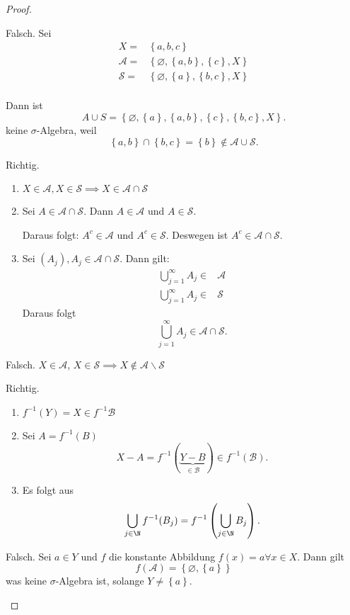 \begin{proof}
	\begin{parts}
	\item Falsch. Sei
		\begin{align*}
			X=&\left\{ a,b,c \right\} \\
			\mathcal A=&\left\{ \varnothing, \left\{ a,b \right\} , \left\{ c \right\} , X \right\} \\
			\mathcal S=&\left\{ \varnothing, \left\{ a \right\} , \left\{ b,c \right\} , X \right\}\\
		\end{align*}

		Dann ist 
		\[
		A\cup S=\left\{ \varnothing, \left\{ a \right\} ,\left\{ a,b \right\} , \left\{ c \right\} , \left\{ b,c \right\}, X  \right\} 
		.\] 
		keine $\sigma$-Algebra, weil
		\[
		\left\{ a,b \right\} \cap \left\{ b,c \right\} =\left\{ b \right\} \not\in \mathcal A \cup \mathcal S
		.\] 

	\item Richtig.
		\begin{enumerate}[label=(\arabic*)]
			\item $X\in \mathcal A, X\in \mathcal S\implies X \in\mathcal A \cap \mathcal S$
			\item Sei $A\in \mathcal A\cap \mathcal S$. Dann  $A\in \mathcal A$ und $A\in\mathcal S$. 

				Daraus folgt: $A^c\in\mathcal A$ und $A^c\in \mathcal S$. Deswegen ist $A^c\in \mathcal A \cap \mathcal S$.

			\item Sei $(A_j), A_j\in\mathcal A\cap \mathcal S$. Dann gilt:
\begin{align*}
	\bigcup_{j=1} ^\infty A_j\in& \mathcal A\\
	\bigcup_{j=1} ^\infty A_j\in& \mathcal S
\end{align*}
Daraus folgt
\[
	\bigcup_{j=1} ^\infty A_j\in \mathcal A\cap \mathcal S
.\] 
		\end{enumerate}
	\item Falsch. $X\in \mathcal A$, $X\in \mathcal S\implies X\not\in \mathcal A \backslash\mathcal S$
	\item Richtig.
		 \begin{enumerate}[label=(\arabic*)]
			 \item $f^{-1}(Y)=X\in f^{-1}\mathcal{B}$ 
			 \item Sei $A=f^{-1}(B)$
				 \[
					 X-A=f^{-1}(\underbrace{Y-B}_{\in \mathcal B})\in f^{-1}(\mathcal B)
			 .\] 

		 \item Es folgt aus
			 \[
				 \bigcup_{j\in \N} f^{-1}(B_j)=f^{-1}\left( \bigcup_{j\in \N} B_j \right) 
			 .\] 
	 \end{enumerate}
		 \item Falsch. Sei $a\in Y$ und $f$ die konstante Abbildung $f(x)=a\forall x\in X$. Dann gilt
			 \[
			 f(\mathcal A)=\left\{ \varnothing, \left\{ a \right\}  \right\} 
			 \] 
			 was keine $\sigma$-Algebra ist, solange $Y\neq \left\{ a \right\} $.
	\end{parts}
\end{proof}
